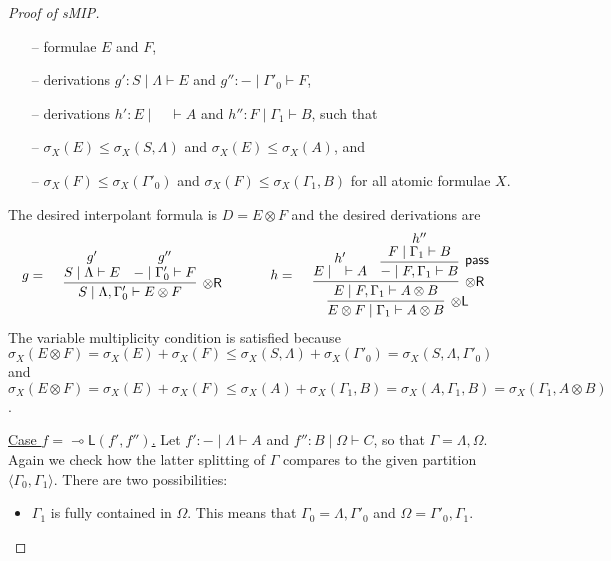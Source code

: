 \documentclass[sn-mathphys-num]{sn-jnl}%
\newcommand{\GG}{\Gamma}
\newcommand{\GL}{\Lambda}
\newcommand{\GO}{\Omega}
\newcommand{\vd}{\vdash}
\newcommand{\tl}{\otimes \mathsf{L}}
\newcommand{\tr}{\otimes\mathsf{R}}
\newcommand{\pass}{\mathsf{pass}}
\newcommand{\ot}{\otimes}
\newcommand{\lolli}{\multimap}
\newcommand{\lleft}{{\lolli}\mathsf{L}}
\newcommand{\proofbox}[1]{\begin{tabular}{l} #1 \end{tabular}}
\newcommand{\gs}[1]{\sigma_{X} (#1)}
\newcommand{\sMIP}{\textsf{sMIP}}
\theoremstyle{thmstyleone}%
\theoremstyle{thmstyletwo}%
\theoremstyle{thmstylethree}%
\begin{document}
\begin{proof}[Proof of \sMIP]
\begin{itemize}
    \begin{itemize}
      \item[--] formulae $E$ and $F$,
      \item[--] derivations $g' : S \mid \GL \vd E$ and $g'' : {-} \mid \GG'_0 \vd F$,
      \item[--] derivations $h' : E \mid \quad \vd A$ and $h'' : F \mid \GG_1 \vd B$, such that
      \item[--] $\gs{E} \leq \gs{S, \GL} $ and $ \gs{E} \leq \gs{A}$, and
      \item[--] $\gs{F} \leq \gs{\GG'_0} $ and $ \gs{F} \leq \gs{\GG_1, B}$ for all atomic formulae $X$.
    \end{itemize}
    The desired interpolant formula is $D = E \ot F$ and the desired derivations are
    \begin{displaymath}
      \begin{array}{c}
        \begin{array}{c}
          g
          =
          \proofbox{\infer[\tr]{S \mid \GL , \GG'_0 \vd E \ot F}{
          \deduce{S \mid \GL \vd E}{g'}
          &
          \deduce{{-} \mid \GG'_0 \vd F}{g''}
          }}
        \end{array}
        \qquad
        \begin{array}{c}
          h
          =
          \proofbox{\infer[\tl]{E \ot F \mid \GG_1 \vd A \ot B}{
          \infer[\tr]{E \mid F , \GG_1 \vd A \ot B}{
          \deduce{E \mid \quad \vd A}{h'}
          &
          \infer[\pass]{{-} \mid F , \GG_1 \vd B}{
          \deduce{F \mid \GG_1 \vd B}{h''}
          }
          }
          }}
        \end{array}
      \end{array}
    \end{displaymath}
    The variable multiplicity condition is satisfied because $\gs{E \ot F} = \gs{E} + \gs{F} \leq \gs{S , \GL} + \gs{\GG'_0} = \gs{S, \GL , \GG'_0}$ and $\gs{E \ot F} = \gs{E} + \gs{F} \leq \gs{A} + \gs{\GG_1 , B} = \gs{A, \GG_1 , B} = \gs{\GG_1, A \ot B}$.
  \end{itemize}
  \underline{Case $f = \lleft(f',f'')$.}
  Let $f' : {-} \mid \GL \vd A$ and $f'' : B \mid \GO \vd C$, so that $\GG = \GL,\GO$. 
  Again we check how the latter splitting of $\GG$ compares to the given partition $\langle \GG_0,\GG_1 \rangle$. 
  There are two possibilities:
  \begin{itemize}
    \item  $\GG_1$ is fully contained in $\GO$. 
    This means that $\GG_0 = \GL,\GG'_0$ and $\GO = \GG'_0,\GG_1$.

\end{itemize}
\end{proof}
\end{document}
